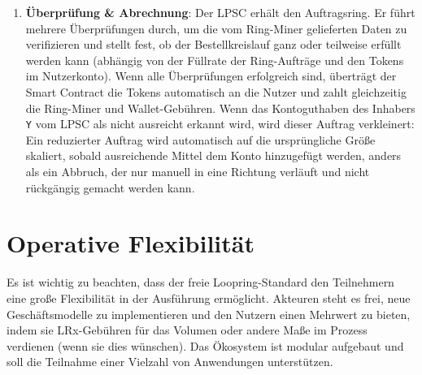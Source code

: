 \documentclass[UTF8,nofonts]{article}
\makeatletter
\newenvironment{figurehere}
 {\def\@captype{figure}}
 {}
\makeatother
\begin{document}
\begin{multicols}{2}
\begin{enumerate}
\item \textbf{Überprüfung \& Abrechnung}: Der LPSC erhält den Auftragsring. Er führt mehrere Überprüfungen durch, um die vom Ring-Miner gelieferten Daten zu verifizieren und stellt fest, ob der Bestellkreislauf ganz oder teilweise erfüllt werden kann (abhängig von der Füllrate der Ring-Aufträge und den Tokens im Nutzerkonto). Wenn alle Überprüfungen erfolgreich sind, überträgt der Smart Contract die Tokens automatisch an die Nutzer und zahlt gleichzeitig die Ring-Miner und Wallet-Gebühren. Wenn das Kontoguthaben des Inhabers \verb|Y| vom LPSC als nicht ausreicht erkannt wird, wird dieser Auftrag verkleinert: Ein reduzierter Auftrag wird automatisch auf die ursprüngliche Größe skaliert, sobald ausreichende Mittel dem Konto hinzugefügt werden, anders als ein Abbruch, der nur manuell in eine Richtung verläuft und nicht rückgängig gemacht werden kann.

\end{enumerate}





%
%
%

\section{Operative Flexibilität\label{sec:business_model}}
Es ist wichtig zu beachten, dass der freie Loopring-Standard den Teilnehmern eine große Flexibilität in der Ausführung ermöglicht. Akteuren steht es frei, neue Geschäftsmodelle zu implementieren und den Nutzern einen Mehrwert zu bieten, indem sie LRx-Gebühren für das Volumen oder andere Maße im Prozess verdienen (wenn sie dies wünschen). Das Ökosystem ist modular aufgebaut und soll die Teilnahme einer Vielzahl von Anwendungen unterstützen.


\end{multicols}
\end{document}
